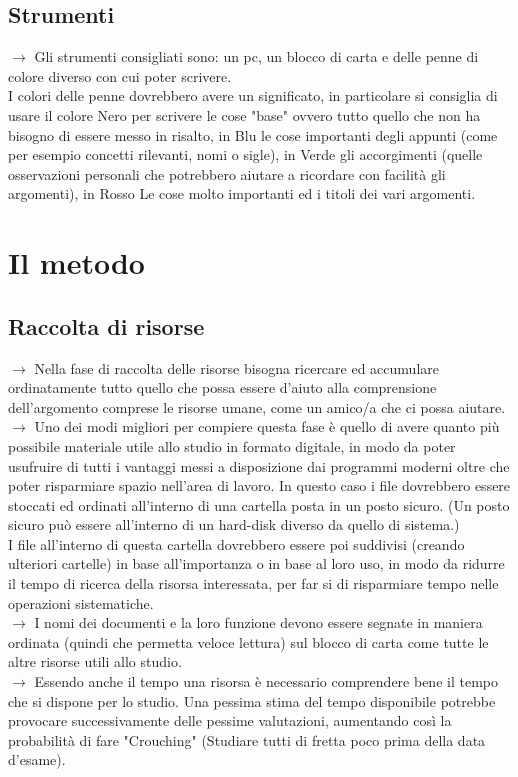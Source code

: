 \documentclass[11pt,a4paper]{article}
\begin{document}
\subsection{Strumenti}
$\rightarrow$ Gli strumenti consigliati sono: un pc, un blocco di carta e delle penne di colore diverso con cui poter scrivere.\\
 I colori delle penne dovrebbero avere un significato, in particolare si consiglia di usare il colore Nero per scrivere le cose "base" ovvero tutto quello che non ha bisogno di essere messo in risalto, in Blu le cose importanti degli appunti (come per esempio concetti rilevanti, nomi o sigle), in Verde gli accorgimenti (quelle osservazioni personali che potrebbero aiutare a ricordare con facilità gli argomenti), in Rosso Le cose molto importanti ed i titoli dei vari argomenti.\\
\newline

\section{Il metodo}
\subsection{Raccolta di risorse}
$\rightarrow$ Nella fase di raccolta delle risorse bisogna ricercare ed accumulare ordinatamente tutto quello che possa essere d'aiuto alla comprensione dell'argomento comprese le risorse umane, come un amico/a che ci possa aiutare.\\
$\rightarrow$ Uno dei modi migliori per compiere questa fase è quello di avere quanto più possibile materiale utile allo studio in formato digitale, in modo da poter usufruire di tutti i vantaggi messi a disposizione dai programmi moderni oltre che poter risparmiare spazio nell'area di lavoro. In questo caso i file dovrebbero essere stoccati ed ordinati all'interno di una cartella posta in un posto sicuro. (Un posto sicuro può essere all'interno di un hard-disk diverso da quello di sistema.)\\
I file all'interno di questa cartella dovrebbero essere poi suddivisi (creando ulteriori cartelle) in base all'importanza o in base al loro uso, in modo da ridurre il tempo di ricerca della risorsa interessata, per far si di risparmiare tempo nelle operazioni sistematiche.\\ 
$\rightarrow$ I nomi dei documenti e la loro funzione devono essere segnate in maniera ordinata (quindi che permetta veloce lettura) sul blocco di carta come tutte le altre risorse utili allo studio.\\
$\rightarrow$ Essendo anche il tempo una risorsa è necessario comprendere bene il tempo che si dispone per lo studio. Una pessima stima del tempo disponibile potrebbe provocare successivamente delle pessime valutazioni, aumentando così la probabilità di fare "Crouching" (Studiare tutti di fretta poco prima della data d'esame).\\
\end{document}
